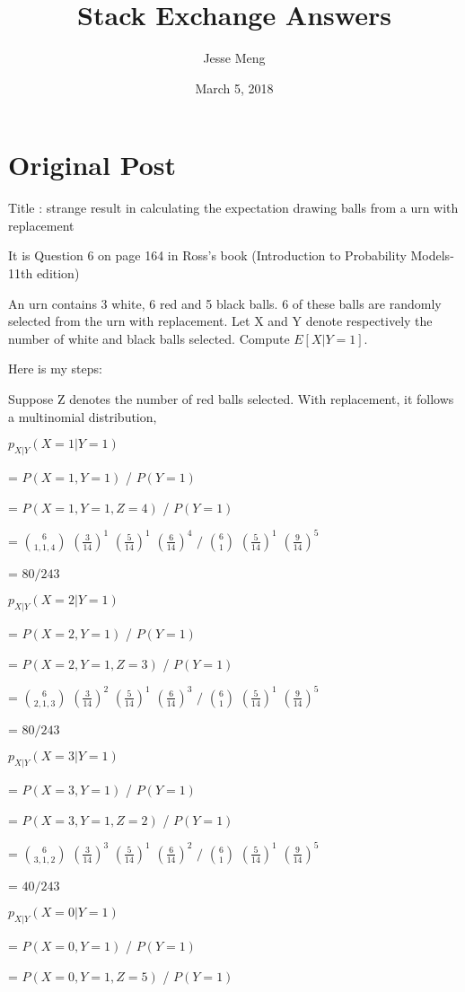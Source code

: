 \documentclass{article}
\title{Stack Exchange Answers}
\author{Jesse Meng }
\date{March 5, 2018}
\begin{document}
\maketitle

\section{Original Post}
Title : strange result in calculating the expectation drawing balls from a urn with replacement

It is Question 6 on page 164 in Ross's book (Introduction to Probability Models-11th edition)

An urn contains 3 white, 6 red and 5 black balls. 6 of these balls are randomly selected from the urn with replacement. Let X and Y denote respectively the number of white and black balls selected. Compute $E[X|Y = 1]$.

Here is my steps:

Suppose Z denotes the number of red balls selected. With replacement, it follows a multinomial distribution,

$p_{X|Y}(X = 1|Y = 1)$ 

= $P(X=1,Y=1)$ / $P(Y=1)$

= $P(X = 1,Y = 1,Z = 4)$ / $P(Y = 1)$

= ${6\choose 1, 1, 4}$ $(\frac{3}{14})^1$ $(\frac{5}{14})^1$ $(\frac{6}{14})^4$ 
$/$ ${6\choose 1}$ $(\frac{5}{14})^1$ $(\frac{9}{14})^5$

= $80/243$

$p_{X|Y}(X = 2|Y = 1)$ 

= $P(X=2,Y=1)$ / $P(Y=1)$

= $P(X = 2,Y = 1,Z = 3)$ / $P(Y = 1)$

= ${6\choose 2, 1, 3}$ $(\frac{3}{14})^2$ $(\frac{5}{14})^1$ $(\frac{6}{14})^3$ 
$/$ ${6\choose 1}$ $(\frac{5}{14})^1$ $(\frac{9}{14})^5$

= $80/243$


$p_{X|Y}(X = 3|Y = 1)$ 

= $P(X=3,Y=1)$ / $P(Y=1)$

= $P(X = 3,Y = 1,Z = 2)$ / $P(Y = 1)$

= ${6\choose 3, 1, 2}$ $(\frac{3}{14})^3$ $(\frac{5}{14})^1$ $(\frac{6}{14})^2$ 
$/$ ${6\choose 1}$ $(\frac{5}{14})^1$ $(\frac{9}{14})^5$

= $40/243$

$p_{X|Y}(X = 0|Y = 1)$ 

= $P(X=0,Y = 1)$ / $P(Y=1)$

= $P(X = 0,Y = 1,Z = 5)$ / $P(Y = 1)$
\end{document}

